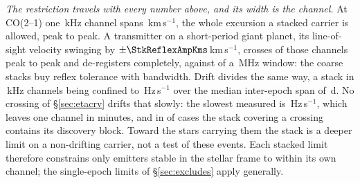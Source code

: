 \emph{The restriction travels with every number above, and its width is the
channel.} At CO(2--1) one \StkRefChanKHz\,kHz channel spans
\StkTolFineKms\,km\,s$^{-1}$, the whole excursion a stacked carrier is
allowed, peak to peak. A transmitter on a short-period giant planet, its
line-of-sight velocity swinging by
$\pm\StkReflexAmpKms$\,km\,s$^{-1}$, crosses \SzReflexPPChanFine{} of those
channels peak to peak and de-registers completely, against
\SzReflexPPChanCoarse{} of a \ChanBModeMHz\,MHz window: the coarse
stacks buy reflex tolerance with bandwidth. Drift divides the same way, a
stack in \StkRefChanKHz\,kHz channels being confined to
\StkDriftTolHzS\,Hz\,s$^{-1}$ over the median inter-epoch span of
\StkSpanMedD\,d. No crossing of \S\ref{sec:etacrv} drifts that slowly: the
slowest measured is \SttDriftMinHzS\,Hz\,s$^{-1}$, which leaves one channel in
\SttDriftMinMin{} minutes, and in \SttNIncDisc{} of \NUnattributed{} cases the
stack covering a crossing contains its discovery block. Toward the
\SttNHostStar{} stars carrying them the stack is a deeper limit on a
non-drifting carrier, not a test of these events. Each
stacked limit therefore constrains only emitters stable in the stellar frame to
within its own channel; the single-epoch limits of \S\ref{sec:excludes} apply
generally.

